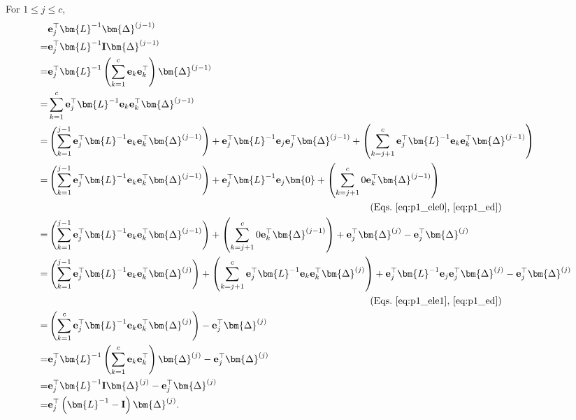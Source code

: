 \documentclass{article} %
\begin{document}
For $1 \le j \le c$,
\begin{equation}
\begin{aligned}
& \mathbf{e}_{j}^\top \bm{L}^{-1} \bm{\Delta}^{(j-1)} \\
= & \mathbf{e}_{j}^\top \bm{L}^{-1} \mathbf{I} \bm{\Delta}^{(j-1)} \\
= & \mathbf{e}_{j}^\top \bm{L}^{-1} \left( \sum_{k=1}^{c} \mathbf{e}_{k} \mathbf{e}_{k}^\top \right) \bm{\Delta}^{(j-1)} \\
= & \sum_{k=1}^{c} \mathbf{e}_{j}^\top \bm{L}^{-1} \mathbf{e}_{k} \mathbf{e}_{k}^\top \bm{\Delta}^{(j-1)} \\
= & \left( \sum_{k=1}^{j-1} \mathbf{e}_{j}^\top \bm{L}^{-1} \mathbf{e}_{k} \mathbf{e}_{k}^\top \bm{\Delta}^{(j-1)} \right) + \mathbf{e}_{j}^\top \bm{L}^{-1} \mathbf{e}_{j} \mathbf{e}_{j}^\top \bm{\Delta}^{(j-1)} + \left( \sum_{k=j+1}^{c} \mathbf{e}_{j}^\top \bm{L}^{-1} \mathbf{e}_{k} \mathbf{e}_{k}^\top \bm{\Delta}^{(j-1)} \right) \\
= & \left( \sum_{k=1}^{j-1} \mathbf{e}_{j}^\top \bm{L}^{-1} \mathbf{e}_{k} \mathbf{e}_{k}^\top \bm{\Delta}^{(j-1)} \right) + \mathbf{e}_{j}^\top \bm{L}^{-1} \mathbf{e}_{j} \bm{0} + \left( \sum_{k=j+1}^{c} 0 \mathbf{e}_{k}^\top \bm{\Delta}^{(j-1)} \right) \\
& \quad\quad\quad\quad\quad\quad\quad\quad\quad\quad\quad\quad\quad\quad\quad\quad\quad\quad\quad\quad\quad\quad\quad\quad\quad\quad\quad\quad\quad\quad\quad\quad\quad \text{(Eqs.~\ref{eq:p1_ele0},~\ref{eq:p1_ed})} \\
= & \left( \sum_{k=1}^{j-1} \mathbf{e}_{j}^\top \bm{L}^{-1} \mathbf{e}_{k} \mathbf{e}_{k}^\top \bm{\Delta}^{(j-1)} \right) + \left( \sum_{k=j+1}^{c} 0 \mathbf{e}_{k}^\top \bm{\Delta}^{(j-1)} \right) + \mathbf{e}_{j}^\top \bm{\Delta}^{(j)} - \mathbf{e}_{j}^\top \bm{\Delta}^{(j)} \\
= & \left( \sum_{k=1}^{j-1} \mathbf{e}_{j}^\top \bm{L}^{-1} \mathbf{e}_{k} \mathbf{e}_{k}^\top \bm{\Delta}^{(j)} \right) + \left( \sum_{k=j+1}^{c} \mathbf{e}_{j}^\top \bm{L}^{-1} \mathbf{e}_{k} \mathbf{e}_{k}^\top \bm{\Delta}^{(j)} \right) + \mathbf{e}_{j}^\top \bm{L}^{-1} \mathbf{e}_{j} \mathbf{e}_{j}^\top \bm{\Delta}^{(j)} - \mathbf{e}_{j}^\top \bm{\Delta}^{(j)} \\
& \quad\quad\quad\quad\quad\quad\quad\quad\quad\quad\quad\quad\quad\quad\quad\quad\quad\quad\quad\quad\quad\quad\quad\quad\quad\quad\quad\quad\quad\quad\quad\quad\quad \text{(Eqs.~\ref{eq:p1_ele1},~\ref{eq:p1_ed})} \\
= & \left( \sum_{k=1}^{c} \mathbf{e}_{j}^\top \bm{L}^{-1} \mathbf{e}_{k} \mathbf{e}_{k}^\top \bm{\Delta}^{(j)} \right) - \mathbf{e}_{j}^\top \bm{\Delta}^{(j)} \\
= & \mathbf{e}_{j}^\top \bm{L}^{-1} \left( \sum_{k=1}^{c} \mathbf{e}_{k} \mathbf{e}_{k}^\top \right) \bm{\Delta}^{(j)} - \mathbf{e}_{j}^\top \bm{\Delta}^{(j)} \\
= & \mathbf{e}_{j}^\top \bm{L}^{-1} \mathbf{I} \bm{\Delta}^{(j)} - \mathbf{e}_{j}^\top \bm{\Delta}^{(j)} \\
= & \mathbf{e}_{j}^\top \left( \bm{L}^{-1} - \mathbf{I} \right) \bm{\Delta}^{(j)} .
\end{aligned}
\label{eq:p1_elid}
\end{equation}
\end{document}
